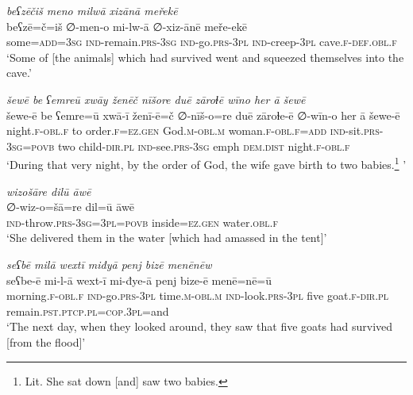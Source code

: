 \ea \label{ZB.23}
\textit{beʕzēčiš meno milwā xizānā meřekē} \\ 
\gll beʕzē=č=iš ∅-men-o mi-lw-ā ∅-xiz-ānē meře-ekē \\ 
 some\textsc{=add}\textsc{=3sg} \textsc{ind-}remain\textsc{.prs}\textsc{-3sg} \textsc{ind-}go\textsc{.prs}\textsc{-3pl} \textsc{ind-}creep\textsc{-3pl} cave\textsc{.f}\textsc{-def}\textsc{.obl}\textsc{.f} \\ 
\glt `Some of [the animals] which had survived went and squeezed themselves into the cave.'
\z 
 
\ea \label{ZB.24}
\textit{šewē be ʕemreū xwāy ženēč nīšore duē zāroɫē wīno her ā šewē} \\ 
\gll šewe-ē be ʕemre=ū xwā-ī ženī-ē=č ∅-nīš-o=re duē zāroɫe-ē ∅-wīn-o her ā šewe-ē \\ 
 night\textsc{.f}\textsc{-obl}\textsc{.f} to order\textsc{.f}\textsc{\textsc{=ez.gen}} God\textsc{.m}\textsc{-obl}\textsc{.m} woman\textsc{.f}\textsc{-obl}\textsc{.f}\textsc{=add} \textsc{ind-}sit\textsc{.prs}\textsc{-3sg}\textsc{=\textsc{povb}} two child\textsc{-dir}\textsc{.pl} \textsc{ind-}see\textsc{.prs}\textsc{-3sg} emph \textsc{dem.dist} night\textsc{.f}\textsc{-obl}\textsc{.f} \\ 
\glt `During that very night, by the order of God, the wife gave birth to two babies.\footnote{Lit. She sat down [and] saw two babies.} '
\z 
 
\ea \label{ZB.25}
\textit{wizošāre dilū āwē} \\ 
\gll ∅-wiz-o=šā=re dil=ū āwē \\ 
 \textsc{ind-}throw\textsc{.prs}\textsc{-3sg=3pl}\textsc{=\textsc{povb}} inside\textsc{\textsc{=ez.gen}} water\textsc{.obl}\textsc{.f} \\ 
\glt `She delivered them in the water [which had amassed in the tent]'
\z 
 
\ea \label{ZB.27}
\textit{seʕbē milā wextī miđyā penj bizē menēnēw} \\ 
\gll seʕbe-ē mi-l-ā wext-ī mi-đye-ā penj bize-ē menē=nē=ū \\ 
 morning\textsc{.f}\textsc{-obl}\textsc{.f} \textsc{ind-}go\textsc{.prs}\textsc{-3pl} time\textsc{.m}\textsc{-obl}\textsc{.m} \textsc{ind-}look\textsc{.prs}\textsc{-3pl} five goat\textsc{.f}\textsc{-dir}\textsc{.pl} remain\textsc{.pst}\textsc{.ptcp}\textsc{.pl}\textsc{=cop}\textsc{.3pl}=and \\ 
\glt `The next day, when they looked around, they saw that five goats had survived [from the flood]'
\z 
 
